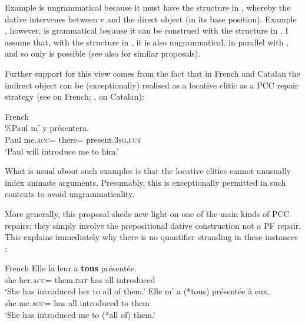 \documentclass[output=paper,colorlinks,citecolor=brown,nonflat]{./langscibook}
\begin{document}
Example  is ungrammatical because it must have the structure in , whereby the dative intervenes between v and the direct object (in its base position). Example , however, is grammatical because it can be construed with the structure in . I assume that, with the structure in , it is also ungrammatical, in parallel with , and so only  is possible (see also \citealt{Anagnostopoulou2003, Rezac2008} for similar proposals). 

Further support for this view comes from the fact that in French and Catalan the indirect object can be (exceptionally) realised as a locative clitic as a PCC repair strategy (see \citealt{Postal1990, Rezac2008} on French; \citealt{Bonet1991}, \citeyear{Bonet2007} on Catalan):

\ea%
    \label{ex:sheehan:42}
    French\\
    \gll  \%Paul   m’       y       présentera.\\
            Paul   me.\textsc{acc}=   there\textsc{=}   present.\textsc{3sg.fut}\\
    \glt   ‘Paul will introduce me to him.’
\z

What is usual about such examples is that the locative clitics cannot unusually index animate arguments. Presumably, this is exceptionally permitted in such contexts to avoid ungrammaticality.

More generally, this proposal sheds new light on one of the main kinds of PCC repairs: they simply involve the prepositional dative construction not a PF repair. This explains immediately why there is no quantifier stranding in these instances \citep{Kayne1975, Rezac2008}:

\ea%
    \label{ex:sheehan:43}
    French \citep[98]{Rezac2008}
    \ea\label{ex:sheehan:43a}
    \gll    Elle   la   leur   a   \textbf{tous}   présentée.\\
            she   her.\textsc{acc}=  them.\textsc{dat}   has   all   introduced\\
    \glt   ‘She has introduced her to all of them.’ 
    \ex\label{ex:sheehan:43b}
    \gll    Elle m'   a   (*tous)   présentée     à   eux.\\
          she me.\textsc{acc}= has   all     introduced  to   them\\
    \glt     ‘She has introduced me to (*all of) them.’
    \z
\z
\end{document}
